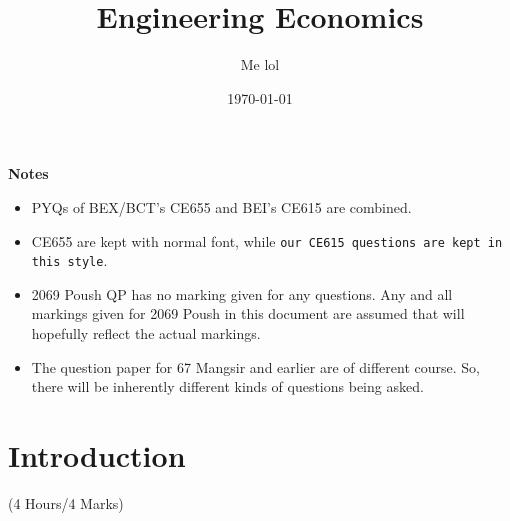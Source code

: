 \documentclass[12pt]{article}
\title{Engineering Economics}
\author{Me lol}
\date{\today}
\begin{document}
\maketitle
\vspace{10cm}
\begin{large}\textbf{Notes}\end{large}
\begin{itemize}
\item PYQs of BEX/BCT's CE655 and BEI's CE615 are combined.
\item CE655 are kept with normal font, while \texttt{our CE615 questions are kept in this style}.
\item 2069 Poush QP has no marking given for any questions. Any and all markings given for 2069 Poush in this document are assumed that will hopefully reflect the actual markings.
\item The question paper for 67 Mangsir and earlier are of different course. So, there will be inherently different kinds of questions being asked.
\end{itemize}
\pagebreak
\tableofcontents
\pagebreak

\section{Introduction}
\begin{center}(4 Hours/4 Marks)\end{center}
\end{document}
